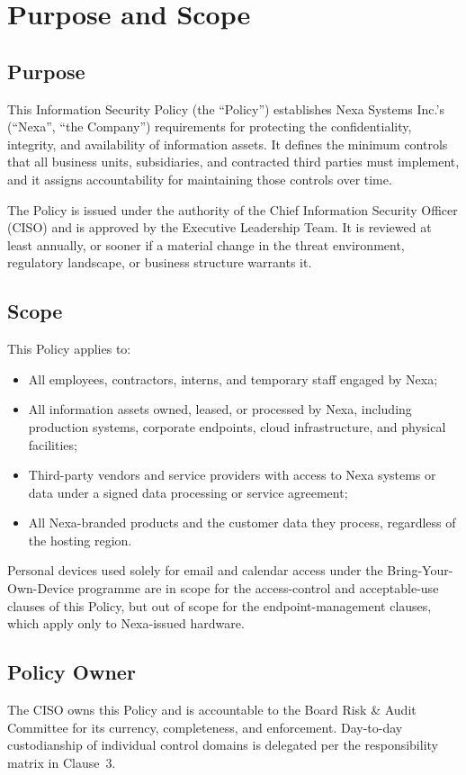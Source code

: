 \section{Purpose and Scope}

\subsection{Purpose}
This Information Security Policy (the ``Policy'') establishes Nexa Systems Inc.'s
(``Nexa'', ``the Company'') requirements for protecting the confidentiality, integrity,
and availability of information assets. It defines the minimum controls that all business
units, subsidiaries, and contracted third parties must implement, and it assigns
accountability for maintaining those controls over time.

The Policy is issued under the authority of the Chief Information Security Officer (CISO)
and is approved by the Executive Leadership Team. It is reviewed at least annually, or
sooner if a material change in the threat environment, regulatory landscape, or business
structure warrants it.

\subsection{Scope}
This Policy applies to:
\begin{itemize}[topsep=2pt, itemsep=2pt]
  \item All employees, contractors, interns, and temporary staff engaged by Nexa;
  \item All information assets owned, leased, or processed by Nexa, including production
        systems, corporate endpoints, cloud infrastructure, and physical facilities;
  \item Third-party vendors and service providers with access to Nexa systems or data
        under a signed data processing or service agreement;
  \item All Nexa-branded products and the customer data they process, regardless of the
        hosting region.
\end{itemize}

Personal devices used solely for email and calendar access under the Bring-Your-Own-Device
programme are in scope for the access-control and acceptable-use clauses of this Policy,
but out of scope for the endpoint-management clauses, which apply only to Nexa-issued
hardware.

\subsection{Policy Owner}
The CISO owns this Policy and is accountable to the Board Risk \& Audit Committee for its
currency, completeness, and enforcement. Day-to-day custodianship of individual control
domains is delegated per the responsibility matrix in Clause~3.

